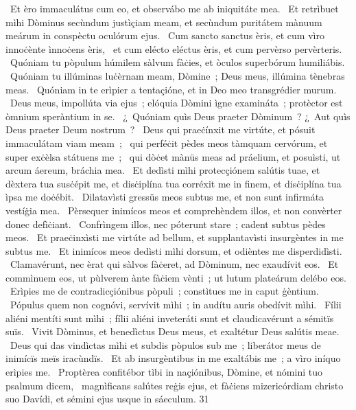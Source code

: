 {~Et èro immaculátus cum eo, et observábo me ab iniquitáte mea. 
~Et retrìbuet mìhi Dòminus secùndum justìçiam meam, et secùndum puritátem mànuum meárum in conspèctu oculórum ejus. 
~Cum sancto sanctus èris, et cum vìro innoċènte ìnnoċens èris, 
~et cum elécto eléctus èris, et cum pervèrso pervèrteris. 
~Quóniam tu pòpulum húmilem sàlvum fàċies, et òculos superbórum humiliábis. 
~Quóniam tu illúminas luċèrnam meam, Dòmine~; Deus meus, illúmina tènebras meas. 
~Quóniam in te erìpier a tentaçióne, et in Deo meo transgrédier murum. 
~Deus meus, impollúta via ejus~; elóquia Dòmini ìgne examináta~; protèctor est òmnium speràntium in se. 
~¿~Quóniam quìs Deus praeter Dòminum~? ¿~Aut quìs Deus praeter Deum nostrum~? 
~Deus qui praeċínxit me virtúte, et pósuit immaculátam viam meam~; 
~qui perféċit pèdes meos tàmquam cervórum, et super exċèlsa státuens me~; 
~qui dòċet mànüs meas ad práelium, et posuìsti, ut arcum áereum, bráchia mea. 
~Et dedìsti mìhi protecçiónem salútis tuae, et dèxtera tua susċépit me, et disċiplína tua corréxit me in finem, et disċiplína tua ìpsa me doċébit. 
~Dilatavìsti gressüs meos subtus me, et non sunt infirmáta vestíġia mea. 
~Pèrsequer inimícos meos et comprehèndem illos, et non convèrter donec defìċiant. 
~Confrìngem illos, nec póterunt stare~; cadent subtus pèdes meos. 
~Et praeċinxìsti me virtúte ad bellum, et supplantavìsti insurgèntes in me subtus me. 
~Et inimícos meos dedìsti mìhi dorsum, et odièntes me disperdidìsti. 
~Clamavérunt, nec èrat qui sàlvos fàċeret, ad Dòminum, nec exaudívit eos. 
~Et commìnuem eos, ut pùlverem ànte fàċiem vènti~; ut lutum plateárum delébo eos. 
~Erìpies me de contradicçiónibus pòpuli~; constìtues me in caput ġèntium. 
~Pópulus quem non cognóvi, servívit mìhi~; in audítu auris obedívit mìhi. 
~Fílii aliéni mentíti sunt mìhi~; fílii aliéni inveteráti sunt et claudicavérunt a sémitïs suïs. 
~Vivit Dòminus, et benedìctus Deus meus, et exaltétur Deus salútis meae. 
~Deus qui das vindìctas mìhi et subdis pòpulos sub me~; liberátor meus de inimícïs meïs iracùndïs. 
~Et ab insurgèntibus in me exaltábis me~; a vìro iníquo erìpies me. 
~Proptèrea confitébor tìbi in naçiónibus, Dòmine, et nómini tuo psalmum dicem, 
~magnìficans salútes reġis ejus, et fàċiens mizericórdiam christo suo Davídi, et sémini ejus usque in sáeculum. 
}
{3}{1}
